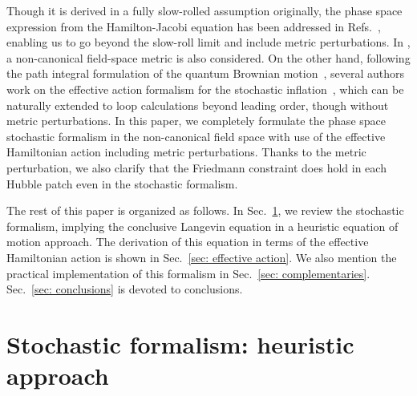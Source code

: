 \documentclass[a4paper,11pt]{article}
\begin{document}
Though it is derived in a fully slow-rolled assumption originally, the phase space expression from the Hamilton-Jacobi equation has been addressed in 
Refs.~\cite{Tolley:2008na,Grain:2017dqa,Ezquiaga:2018gbw}, enabling us to go beyond the slow-roll limit and include metric perturbations.
In \cite{Tolley:2008na}, a non-canonical field-space metric is also considered. On the other hand, following the path integral formulation of the quantum 
Brownian motion~\cite{Schwinger:1960qe,Feynman:1963fq}, several authors work on the effective action formalism for 
the stochastic inflation~\cite{Morikawa:1989xz,Matarrese:2003ye,Levasseur:2013ffa,Moss:2016uix,Tokuda:2017fdh}, 
which can be naturally extended to loop calculations beyond leading order, though without metric perturbations.
In this paper, we completely formulate the phase space stochastic formalism in the non-canonical field space with use of the effective Hamiltonian action
including metric perturbations. Thanks to the metric perturbation, we also clarify that the Friedmann constraint does hold in each Hubble patch
even in the stochastic formalism.

The rest of this paper is organized as follows. In Sec.~\ref{sec: heuristic approach}, we review the stochastic formalism, implying 
the conclusive Langevin equation in a heuristic equation of motion approach. 
The derivation of this equation in terms of the effective Hamiltonian action 
is shown in Sec.~\ref{sec: effective action}. We also mention the practical implementation of this formalism in Sec.~\ref{sec: complementaries}.
Sec.~\ref{sec: conclusions} is devoted to conclusions.






\section{Stochastic formalism: heuristic approach}\label{sec: heuristic approach}
\end{document}
